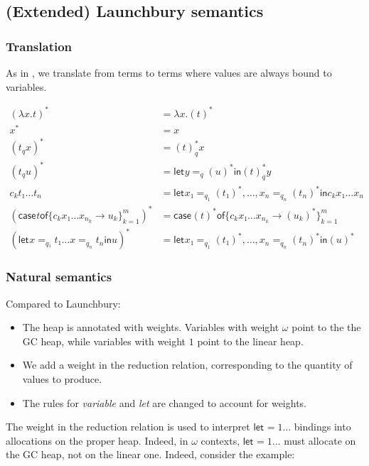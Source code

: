 \documentclass[11pt]{article}
\newcommand{\case}[3][]{\mathsf{case}_{#1} #2 \mathsf{of} \{#3\}^m_{k=1}}
\newcommand{\flet}[1][]{\mathsf{let}_{#1} }
\newcommand{\fin}{ \mathsf{in} }
\begin{document}
\subsection{(Extended) Launchbury semantics}
\label{sec:orgheadline11}

\subsubsection{Translation}
\label{sec:orgheadline9}
As in \textcite{launchbury_natural_1993}, we translate from terms to
terms where values are always bound to variables.


\begin{align*}
(λx. t)^* &= λx. (t)^* \\
x^*       &= x \\
  (t_q  x )^* &= (t)^*_q  x \\
  (t_q  u )^* &= \flet y =_{q} (u)^* \fin (t)^*_q  y \\
c_k  t₁ … t_n &= \flet x₁ =_{q_1} (t₁)^*,…, x_n =_{q_n} (t_n)^* \fin c_k x₁ … x_n \\
(\case t {c_k  x₁ … x_{n_k} → u_k})^* &= \case {(t)^*} {c_k  x₁ … x_{n_k} → (u_k)^*} \\
(\flet x =_{q₁} t₁  …  x =_{q_n} t_n \fin u)^* & = \flet x₁ =_{q_1} (t₁)^*,…, x_n =_{q_n} (t_n)^* \fin (u)^*
\end{align*}

\subsubsection{Natural semantics}
Compared to Launchbury:

\begin{itemize}
\item The heap is annotated with weights. Variables with weight $ω$
  point to the the GC heap, while variables with weight $1$ point to
  the linear heap.
\item We add a weight in the reduction relation, corresponding to the
  quantity of values to produce.
\item The rules for \emph{variable} and \emph{let} are changed to
  account for weights.
\end{itemize}

The weight in the reduction relation is used to interpret $\flet =1 …$
bindings into allocations on the proper heap.  Indeed, in $ω$ contexts,
$\flet =1 …$ must allocate on the GC heap, not on the linear
one. Indeed, consider the example:
\end{document}
